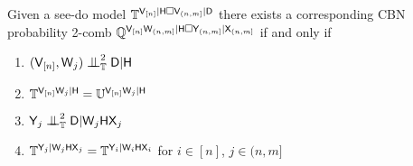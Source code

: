 \begin{theorem}\label{th:seedo_rep}
Given a see-do model $\mathbb{T}^{\mathsf{V}_{[n]}|\mathsf{H}\square \mathsf{V}_{(n,m]}|\mathsf{D}}$ there exists a corresponding CBN probability 2-comb $\mathbb{Q}^{\mathsf{V}_{[n]}\mathsf{W}_{(n,m]}|\mathsf{H}\square \mathsf{Y}_{(n,m]}|\mathsf{X}_{(n,m]}}$ if and only if
\begin{enumerate}
    \item $(\RV{V}_{[n]},\RV{W}_j)\CI^2_{\model{T}} \RV{D}|\RV{H}$
    \item $\mathbb{T}^{\mathsf{V}_{[n]}\mathsf{W}_j|\mathsf{H}} = \mathbb{U}^{\mathsf{V}_{[n]}\mathsf{W}_j|\mathsf{H}}$
    \item $\RV{Y}_j\CI^2_{\model{T}}\RV{D}|\RV{W}_j\RV{HX}_j$
    \item $\mathbb{T}^{\mathsf{Y}_j|\mathsf{W}_j\mathsf{HX}_j} = \mathbb{T}^{\mathsf{Y}_i|\mathsf{W}_i\mathsf{HX}_i}$ for $i\in [n]$, $j\in (n,m]$
\end{enumerate}
\end{theorem}

